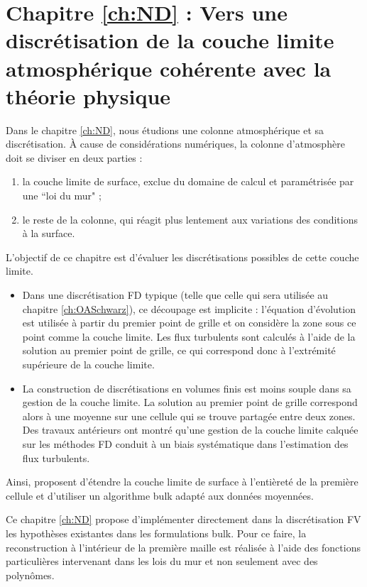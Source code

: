 \section*{Chapitre \ref{ch:ND} : Vers une discrétisation de la couche limite atmosphérique cohérente avec la théorie physique}
Dans le chapitre \ref{ch:ND}, nous étudions une colonne atmosphérique et sa discrétisation.
À cause de considérations numériques, la colonne
d'atmosphère doit se diviser en deux parties :
\begin{enumerate}
	\item
	la couche limite de surface, exclue du domaine
	de calcul et paramétrisée par une ``loi du mur" ;
	\item
	le reste de la colonne, qui réagit plus lentement
	aux variations des conditions à la surface.
\end{enumerate}
L'objectif de ce chapitre est d'évaluer les discrétisations possibles
de cette couche limite.
\begin{itemize}
	\item
Dans une discrétisation FD typique (telle que celle qui sera
utilisée au chapitre \ref{ch:OASchwarz}), ce découpage est implicite :
l'équation d'évolution est utilisée à partir
du premier point de grille et on considère la zone
sous ce point comme la couche limite.
Les flux turbulents sont calculés à l'aide de la solution
	au premier point de grille, ce qui correspond donc à
	l'extrémité supérieure de la couche limite.
\item La construction de discrétisations en volumes finis
	est moins souple dans sa gestion de la couche limite.
	La solution au premier point de grille correspond
	alors à une moyenne sur une cellule qui se trouve
	partagée entre deux zones.
	Des travaux antérieurs ont montré qu'une gestion
	de la couche limite calquée sur les méthodes FD
	conduit à un biais systématique dans l'estimation
	des flux turbulents.
\end{itemize}
Ainsi, \citep{nishizawa_surface_2018} proposent
d'étendre la couche limite de surface à l'entièreté de
la première cellule et d'utiliser un algorithme bulk
adapté aux données moyennées.
\par
Ce chapitre \ref{ch:ND} propose d'implémenter
directement dans la discrétisation FV les hypothèses
existantes dans les formulations bulk.
	Pour ce faire, la reconstruction à l'intérieur
	de la première maille est réalisée à l'aide des fonctions
	particulières intervenant dans les lois du mur et
	non seulement avec des polynômes.
\par
